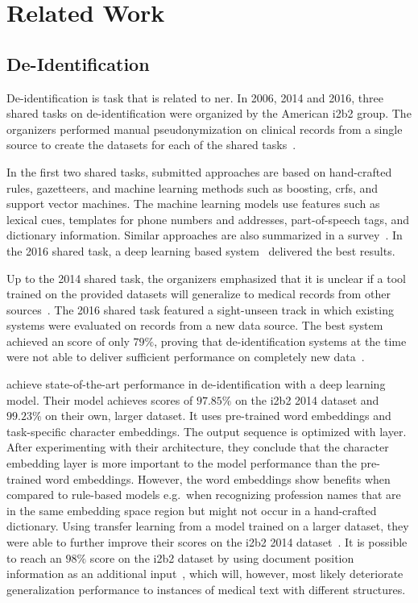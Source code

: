 
\section{Related Work}\label{sec:related}

\subsection{De-Identification}
De-identification is  task that is related to \ac{ner}.
%
In 2006, 2014 and 2016, three shared tasks on de-identification were organized by the American i2b2 group.
%
The organizers performed manual pseudonymization on clinical records from a single source to create the datasets for each of the shared tasks~\citep{stubbs2015annotating}.

%
In the first two shared tasks, submitted approaches are based on hand-crafted rules, gazetteers, and machine learning methods such as boosting, \acp{crf}, and support vector machines.
%
The machine learning models use features such as lexical cues, templates for phone numbers and addresses, part-of-speech tags, and dictionary information.
%
Similar approaches are also summarized in a survey~\citep{meystre2010automatic}.
%
In the 2016 shared task, a deep learning based system~\citep{liu2017identification} delivered the best results.

%
Up to the 2014 shared task, the organizers emphasized that it is unclear if a tool trained on the provided datasets will generalize to medical records from other sources~\citep{uzuner2007evaluating,stubbs2015automated}.
%
The 2016 shared task featured a sight-unseen track in which existing systems were evaluated on records from a new data source.
%
The best system achieved an \fone score of only $79\%$, proving that de-identification systems at the time were not able to deliver sufficient performance on completely new data~\citep{stubbs2017identification}.

%
\citet{dernoncourt2017identification} achieve state-of-the-art performance in de-identification with a deep learning model.
%
Their model achieves \fone scores of $97.85\%$ on the i2b2 2014 dataset and $99.23\%$ on their own, larger dataset.
%
It uses pre-trained word embeddings and task-specific character embeddings.
%
The output sequence is optimized with  layer.
%
After experimenting with their architecture, they conclude that the character embedding layer is more important to the model performance than the pre-trained word embeddings.
%
However, the word embeddings show benefits when compared to rule-based models e.g.\ when recognizing profession names that are in the same embedding space region but might not occur in a hand-crafted dictionary.
%
Using transfer learning from a model trained on a larger dataset, they were able to further improve their scores on the i2b2 2014 dataset~\citep{lee2017transfer}.
%
It is possible to reach an $98\%$ \fone score on the i2b2 dataset by using document position information as an additional input~\citep{zhao2018leveraging}, which will, however, most likely deteriorate generalization performance to instances of medical text with different structures.

